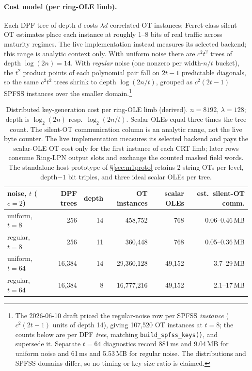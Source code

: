 \documentclass[11pt]{article}
\begin{document}
\paragraph{Cost model (per ring-OLE limb).} Each DPF tree of depth $d$ costs
$\lambda d$ correlated-OT instances; Ferret-class silent OT estimates place
each instance at roughly 1--8 bits of real traffic across maturity regimes.
The live implementation instead measures its selected backend; this range is
analytic context only. With uniform noise there are
$c^2t^2$ trees of depth $\log(2n) = 14$. With \emph{regular} noise (one
nonzero per width-$n/t$ bucket), the $t^2$ product points of each polynomial
pair fall on $2t-1$ predictable diagonals, so the same $c^2t^2$ trees shrink
to depth $\log(2n/t)$, grouped as $c^2(2t-1)$ SPFSS instances over the smaller
domain.\footnote{The 2026-06-10 draft priced the regular-noise row per SPFSS
\emph{instance} ($c^2(2t-1)$ units of depth 14), giving 107{,}520 OT
instances at $t{=}8$; the counts below are per DPF \emph{tree}, matching
\texttt{build\_spfss\_keys()}, and supersede it. Separate $t{=}64$
diagnostics record 881\,ms and 9.04\,MB for uniform noise and 61\,ms and
5.53\,MB for regular noise. The distributions and SPFSS domains differ, so no
timing or key-size ratio is claimed.}

\begin{table}[ht]
\centering
\small
\begin{tabular}{lrrrrr}
\toprule
noise, $t$ ($c{=}2$) & DPF trees & depth & OT instances & scalar OLEs & est.\ silent-OT comm.\\
\midrule
uniform, $t{=}8$  & 256    & 14 & 458{,}752   & 768    & 0.06--0.46\,MB\\
regular, $t{=}8$  & 256    & 11 & 360{,}448   & 768    & 0.05--0.36\,MB\\
uniform, $t{=}64$ & 16{,}384 & 14 & 29{,}360{,}128 & 49{,}152 & 3.7--29\,MB\\
regular, $t{=}64$ & 16{,}384 & 8  & 16{,}777{,}216 & 49{,}152 & 2.1--17\,MB\\
\bottomrule
\end{tabular}
\caption{Distributed key-generation cost per ring-OLE limb (derived).
$n=8192$, $\lambda=128$; depth is $\log_2(2n)$ resp.\
$\log_2(2n/t)$. Scalar OLEs equal three times the tree count. The silent-OT
communication column is an analytic range, not the live byte counter. The live
implementation measures its selected backend and pays the scalar-OLE OT cost
only for the first instance of each CRT limb; later rows consume Ring-LPN
output slots and exchange the counted masked field words. The standalone host
prototype of \S\ref{sec:m1proto} retains 2 string OTs per level,
depth$-1$ bit triples, and three ideal scalar OLEs per tree.}
\label{tab:keygen}
\end{table}
\end{document}
